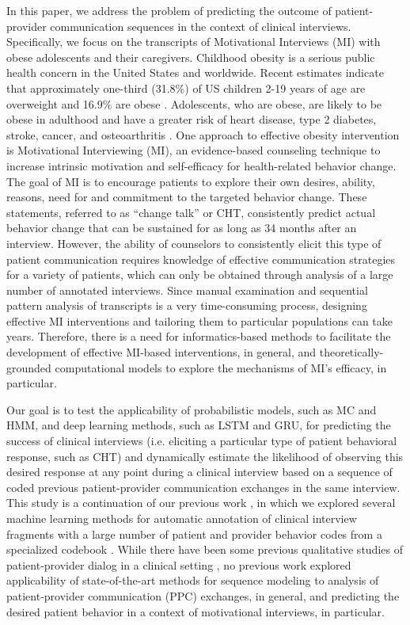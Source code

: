 \documentclass{amia_summit_2018}
\begin{document}
In this paper, we address the problem of predicting the outcome of patient-provider communication sequences in the context of clinical interviews. Specifically, we focus on the transcripts of
Motivational Interviews (MI) with obese adolescents and their caregivers. Childhood obesity is a serious public health concern in the United States and worldwide. Recent estimates indicate that
approximately one-third (31.8\%) of US children 2-19 years of age are overweight and 16.9\% are obese \cite{ogden2012prevalence}. Adolescents, who are obese, are likely to be obese in adulthood and
have a greater risk of heart disease, type 2 diabetes, stroke, cancer, and osteoarthritis \cite{general2010surgeon}. One approach to effective obesity intervention is Motivational Interviewing (MI),
an evidence-based counseling technique to increase intrinsic motivation and self-efficacy for health-related behavior change. The goal of MI is to encourage patients to explore their own desires,
ability, reasons, need for and commitment to the targeted behavior change. These statements, referred to as ``change talk'' or CHT, consistently predict actual behavior
change\cite{apodaca2009mechanisms} that can be sustained for as long as 34 months\cite{walker2011influence} after an interview. However, the ability of counselors to consistently elicit this type of
patient communication requires knowledge of effective communication strategies for a variety of patients, which can only be obtained through analysis of a large number of annotated interviews. Since
manual examination and sequential pattern analysis of transcripts is a very time-consuming process, designing effective MI interventions and tailoring them to particular populations can take years.
Therefore, there is a need for informatics-based methods to facilitate the development of effective MI-based interventions, in general, and theoretically-grounded computational models to explore the
mechanisms of MI's efficacy, in particular.

Our goal is to test the applicability of probabilistic models, such as MC and HMM, and deep learning methods, such as LSTM and GRU, for predicting the success of clinical interviews (i.e. eliciting a
particular type of patient behavioral response, such as CHT) and dynamically estimate the likelihood of observing this desired response at any point during a clinical interview based on a sequence of
coded previous patient-provider communication exchanges in the same interview. This study is a continuation of our previous work \cite{kotov2015interpretable, hasan2016study}, in which we explored
several machine learning methods for automatic annotation of clinical interview fragments with a large number of patient and provider behavior codes from a specialized codebook
\cite{carcone2013provider}. While there have been some previous qualitative studies of patient-provider dialog in a clinical setting \cite{eide2004physician}, no previous work explored applicability
of state-of-the-art methods for sequence modeling to analysis of patient-provider communication (PPC) exchanges, in general, and predicting the desired patient behavior in a context of motivational
interviews, in particular.
\end{document}
